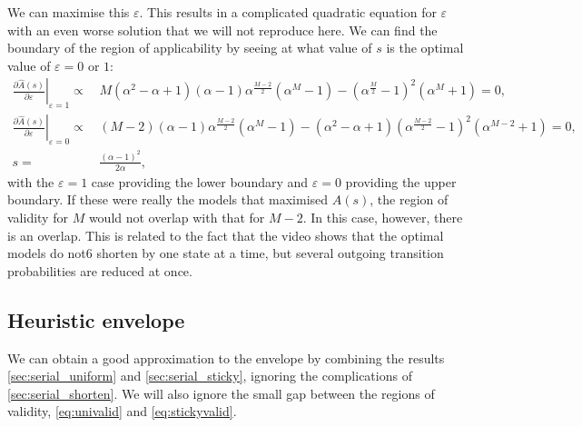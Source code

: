 \documentclass[12pt]{article}
\renewcommand{\pdiff}[2]{\frac{\partial #1}{\partial #2}}
\begin{document}
We can maximise this \wrt $\varepsilon$.
This results in a complicated quadratic equation for $\varepsilon$ with an even worse solution that we will not reproduce here.
We can find the boundary of the region of applicability by seeing at what value of $s$ is the optimal value of $\varepsilon=0\text{ or }1$:
%
\begin{equation}\label{eq:shortenvalid}
\begin{aligned}
  \left.\pdiff{\hat{A}(s)}{\varepsilon}\right|_{\varepsilon=1} \propto &\,
    M(\alpha^2-\alpha+1)(\alpha-1)\alpha^{\frac{M-2}{2}}(\alpha^M-1) - (\alpha^{\frac{M}{2}}-1)^2(\alpha^{M}+1)
      = 0,\\
  \left.\pdiff{\hat{A}(s)}{\varepsilon}\right|_{\varepsilon=0} \propto &\,
    (M-2)(\alpha-1)\alpha^{\frac{M-2}{2}}(\alpha^M-1) - (\alpha^2-\alpha+1)(\alpha^{\frac{M-2}{2}}-1)^2(\alpha^{M-2}+1)
      = 0,\\
    s = &\, \frac{(\alpha-1)^2}{2\alpha},
\end{aligned}
\end{equation}
%
with the $\varepsilon=1$ case providing the lower boundary and $\varepsilon=0$ providing the upper boundary.
If these were really the models that maximised $A(s)$, the region of validity for $M$ would not overlap with that for $M-2$.
In this case, however, there is an overlap.
This is related to the fact that the video shows that the optimal models do not6 shorten by one state at a time, but several outgoing transition probabilities are reduced at once.



\subsection{Heuristic envelope}\label{sec:heuristicenv}


We can obtain a good approximation to the envelope by combining the results \autoref{sec:serial_uniform} and \autoref{sec:serial_sticky}, ignoring the complications of \autoref{sec:serial_shorten}.
We will also ignore the small gap between the regions of validity, \eqref{eq:univalid} and \eqref{eq:stickyvalid}.
\end{document}
